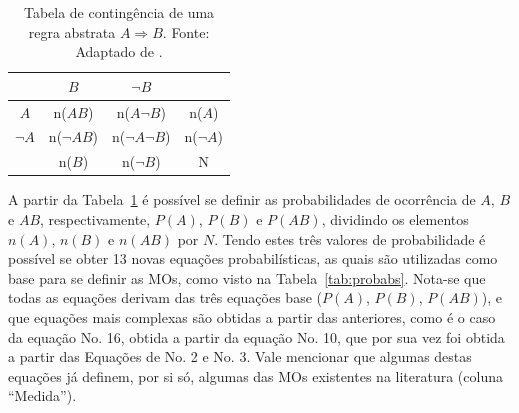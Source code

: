 \begingroup
\setlength{\tabcolsep}{10pt}
\renewcommand{\arraystretch}{1.5}
\begin{table}[!htb]
\caption{Tabela de contingência de uma regra abstrata $A \Rightarrow B$. Fonte: Adaptado de .}
\label{tab:probs}
\begin{tabular}{|c|c|c|c|}
\hline
                      & \textbf{$B$}          & \textbf{$\neg B$} &          \\ \hline
\textbf{$A$}           
& n($AB$)      & n($A \neg B$)            & n($A$)    \\ \hline
\textbf{$\neg A$} & n($\neg A B$) & n($\neg A \neg B$)        & n($\neg A$) \\ \hline
                      & n($B$)       & n($\neg B$)              & N \\ \hline
\end{tabular}
\centering
\end{table}
\endgroup

A partir da Tabela~\ref{tab:probs} é possível se definir as probabilidades de ocorrência de $A$, $B$ e $AB$, respectivamente, $P(A)$, $P(B)$ e $P(AB)$, dividindo os elementos $n(A)$, $n(B)$ e $n(AB)$ por $N$. Tendo estes três valores de probabilidade é possível se obter 13 novas equações probabilísticas, as quais são utilizadas como base para se definir as MOs, como visto na Tabela~\ref{tab:probabs}. Nota-se que todas as equações derivam das três equações base ($P(A)$, $P(B)$, $P(AB)$), e que equações mais complexas são obtidas a partir das anteriores, como é o caso da equação No. 16, obtida a partir da equação No. 10, que por sua vez foi obtida a partir das Equações de No. 2 e No. 3. Vale mencionar que algumas destas equações já definem, por si só, algumas das MOs existentes na literatura (coluna ``Medida'').

